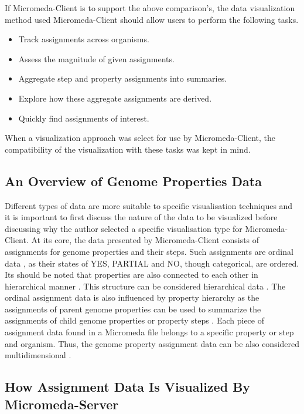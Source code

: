 If Micromeda-Client is to support the above comparison's, the data visualization method used Micromeda-Client should allow users to perform the following tasks.

\begin{itemize}
\item Track assignments across organisms.
\item Assess the magnitude of given assignments.
\item Aggregate step and property assignments into summaries.
\item Explore how these aggregate assignments are derived.
\item Quickly find assignments of interest.
\end{itemize}

When a visualization approach was select for use by Micromeda-Client, the compatibility of the visualization with these tasks was kept in mind.

\subsection{An Overview of Genome Properties Data}

Different types of data are more suitable to specific visualisation techniques and it is important to first discuss the nature of the data to be visualized before discussing why the author selected a specific visualisation type for Micromeda-Client. At its core, the data presented by Micromeda-Client consists of assignments for genome properties and their steps. Such assignments are ordinal data \cite{richardson2018genome,agresti2010analysis}, as their states of YES, PARTIAL and NO, though categorical, are ordered. Its should be noted that properties are also connected to each other in hierarchical manner \cite{richardson2018genome}. This structure can be considered hierarchical data \cite{richardson2018genome,samet1990applications}. The ordinal assignment data is also influenced by property hierarchy as the assignments of parent genome properties can be used to summarize the assignments of child genome properties or property steps \cite{richardson2018genome}. Each piece of assignment data found in a Micromeda file belongs to a specific property or step and organism. Thus, the genome property assignment data can be also considered multidimensional \cite{pedersen1999multidimensional}.

\subsection{How Assignment Data Is Visualized By Micromeda-Server}

